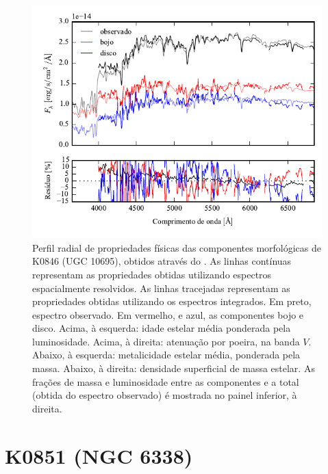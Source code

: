 \begin{figure}
	\includegraphics[page=12]{figuras/sample006a_synthesis}
	\caption[Propriedades físicas das componentes morfológicas de K0846 (UGC 10695)]
	{Perfil radial de propriedades físicas das componentes morfológicas de
	K0846 (UGC 10695), obtidos através do \starlight. As linhas contínuas
	representam as propriedades obtidas utilizando espectros espacialmente
	resolvidos. As linhas tracejadas representam as propriedades obtidas utilizando
	os espectros integrados. Em preto, espectro observado. Em vermelho, e azul, as
	componentes bojo e disco. Acima, à esquerda: idade estelar média ponderada pela
	luminosidade. Acima, à direita: atenuação por poeira, na banda $V$. Abaixo, à
	esquerda: metalicidade estelar média, ponderada pela massa. Abaixo, à direita:
	densidade superficial de massa estelar. As frações de massa e luminosidade
	entre as componentes e a total (obtida do espectro observado) é mostrada no
	painel inferior, à direita.}
	\label{fig:decompSinteseRadprof:K0846}
\end{figure}

\FloatBarrier


\section{K0851 (NGC 6338)}
\label{apendice:Decomp:K0851}

